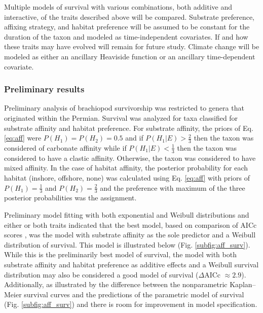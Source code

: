 \documentclass[12pt,letterpaper]{article}
\begin{document}

Multiple models of survival with various combinations, both additive and interactive, of the traits described above will be compared. Substrate preference, affixing strategy, and habitat preference will be assumed to be constant for the duration of the taxon and modeled as time-independent covariates. If and how these traits may have evolved will remain for future study. Climate change will be modeled as either an ancillary Heaviside function or an ancillary time-dependent covariate.



\subsubsection{Preliminary results} \label{sec:bracsurvres}
Preliminary analysis of brachiopod survivorship was restricted to genera that originated within the Permian. Survival was analyzed for taxa classified for substrate affinity and habitat preference. For substrate affinity, the priors of Eq. \ref{eq:aff} were \(P(H_{1}) = P(H_{2}) = 0.5\) and if \(P(H_{1}|E) > \frac{2}{3}\) then the taxon was considered of carbonate affinity while if \(P(H_{1}|E) < \frac{1}{3}\) then the taxon was considered to have a clastic affinity. Otherwise, the taxon was considered to have mixed affinity. In the case of habitat affinity, the posterior probability for each habitat (inshore, offshore, none) was calculated using Eq. \ref{eq:aff} with priors of \(P(H_{1}) = \frac{1}{3}\) and \(P(H_{2}) = \frac{2}{3}\) and the preference with maximum of the three posterior probabilities was the assignment.

Preliminary model fitting with both exponential and Weibull distributions and either or both traits indicated that the best model, based on comparison of AICc scores \citep{Hurvich1989,Akaike1974,Burnham2002a}, was the model with substrate affinity as the sole predictor and a Weibull distribution of survival. This model is illustrated below (Fig. \ref{subfig:aff_surv}). While this is the preliminarily best model of survival, the model with both substrate affinity and habitat preference as additive effects and a Weibull survival distribution may also be considered a good model of survival (\(\Delta\)AICc \(\approx 2.9\)). Additionally, as illustrated by the difference between the nonparametric Kaplan--Meier survival curves and the predictions of the parametric model of survival (Fig. \ref{subfig:aff_surv}) and there is room for improvement in model specification.
\end{document}
